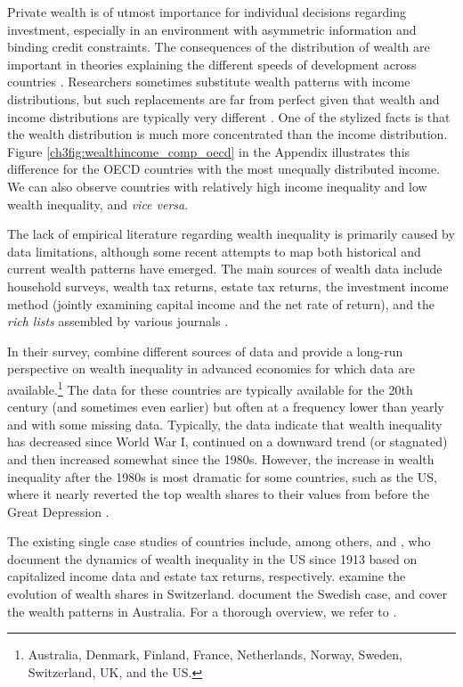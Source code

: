 \begin{refsection}
Private wealth is of utmost importance for individual  decisions regarding investment, especially in an environment with asymmetric information and binding credit constraints. The consequences of the distribution of wealth are important in theories explaining the different speeds of development across countries \parencite{roine2015long}. Researchers sometimes substitute wealth patterns with income distributions, but such replacements are far from perfect given that wealth and income distributions are typically very different \parencite{bagchi2015does}. One of the stylized facts is that the wealth distribution is much more concentrated than the income distribution. Figure \ref{ch3fig:wealthincome_comp_oecd} in the Appendix illustrates this difference for the OECD countries with the most unequally distributed income. We can also observe countries with relatively high income inequality and low wealth inequality, and \textit{vice versa}.

The lack of empirical literature regarding wealth inequality is primarily caused by data limitations, although some recent attempts to map both historical and current wealth patterns have emerged. The main sources of wealth data include household surveys, wealth tax returns, estate tax returns, the investment income method (jointly examining capital income and the net rate of return), and the \textit{rich lists} assembled by various journals \parencite{davies2000distribution}. 

In their survey, \textcite{roine2015long} combine different sources of data and provide a long-run perspective on wealth inequality in advanced economies for which data are available.\footnote{Australia, Denmark, Finland, France, Netherlands, Norway, Sweden, Switzerland, \ac{UK}, and the \ac{US}.} The data for these countries are typically available for the 20th century (and sometimes even earlier) but often at a frequency lower than yearly and with some missing data. Typically, the data indicate that wealth inequality has decreased since World War I, continued on a downward trend (or stagnated) and then increased somewhat since the 1980s. However, the increase in wealth inequality after the 1980s is most dramatic for some countries, such as the \ac{US}, where it nearly reverted the top wealth shares to their values from before the Great Depression \parencite{piketty2014}. 

The existing single case studies of countries include, among others, \textcite{SaezZucman2016} and \textcite{kopczuksaez2004}, who document the dynamics of wealth inequality in the \ac{US} since 1913 based on capitalized income data and estate tax returns, respectively. \textcite{dell2007income} examine the evolution of wealth shares in Switzerland. \textcite{roine2009wealth} document the Swedish case, and \textcite{katic2016top} cover the wealth patterns in Australia. For a thorough overview, we refer to \textcite{roine2015long}.


\end{refsection}

